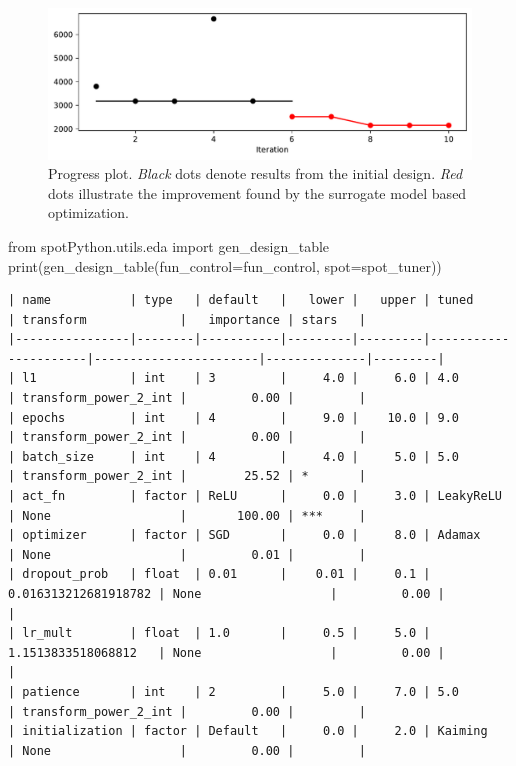 \documentclass[
  letterpaper,
  DIV=11,
  numbers=noendperiod]{scrreprt}
\newenvironment{Shaded}{\begin{snugshade}}{\end{snugshade}}
\newcommand{\BuiltInTok}[1]{\textcolor[rgb]{0.00,0.23,0.31}{#1}}
\newcommand{\ImportTok}[1]{\textcolor[rgb]{0.00,0.46,0.62}{#1}}
\newcommand{\NormalTok}[1]{\textcolor[rgb]{0.00,0.23,0.31}{#1}}
\newcommand{\OperatorTok}[1]{\textcolor[rgb]{0.37,0.37,0.37}{#1}}
\begin{document}
\begin{figure}[H]

{\centering \includegraphics{031_spot_lightning_linear_diabetes_files/figure-pdf/cell-13-output-1.pdf}

}

\caption{Progress plot. \emph{Black} dots denote results from the
initial design. \emph{Red} dots illustrate the improvement found by the
surrogate model based optimization.}

\end{figure}%

\begin{Shaded}
\begin{Highlighting}[]
\ImportTok{from}\NormalTok{ spotPython.utils.eda }\ImportTok{import}\NormalTok{ gen\_design\_table}
\BuiltInTok{print}\NormalTok{(gen\_design\_table(fun\_control}\OperatorTok{=}\NormalTok{fun\_control, spot}\OperatorTok{=}\NormalTok{spot\_tuner))}
\end{Highlighting}
\end{Shaded}

\begin{verbatim}
| name           | type   | default   |   lower |   upper | tuned                | transform             |   importance | stars   |
|----------------|--------|-----------|---------|---------|----------------------|-----------------------|--------------|---------|
| l1             | int    | 3         |     4.0 |     6.0 | 4.0                  | transform_power_2_int |         0.00 |         |
| epochs         | int    | 4         |     9.0 |    10.0 | 9.0                  | transform_power_2_int |         0.00 |         |
| batch_size     | int    | 4         |     4.0 |     5.0 | 5.0                  | transform_power_2_int |        25.52 | *       |
| act_fn         | factor | ReLU      |     0.0 |     3.0 | LeakyReLU            | None                  |       100.00 | ***     |
| optimizer      | factor | SGD       |     0.0 |     8.0 | Adamax               | None                  |         0.01 |         |
| dropout_prob   | float  | 0.01      |    0.01 |     0.1 | 0.016313212681918782 | None                  |         0.00 |         |
| lr_mult        | float  | 1.0       |     0.5 |     5.0 | 1.1513833518068812   | None                  |         0.00 |         |
| patience       | int    | 2         |     5.0 |     7.0 | 5.0                  | transform_power_2_int |         0.00 |         |
| initialization | factor | Default   |     0.0 |     2.0 | Kaiming              | None                  |         0.00 |         |
\end{verbatim}
\end{document}
